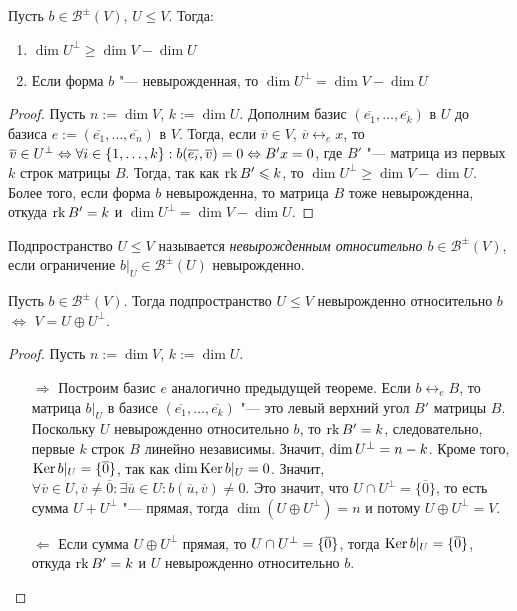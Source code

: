 \begin{theorem}Пусть $b \in \mathcal{B}^\pm(V)$, $U \le V$. Тогда:
	\begin{enumerate}
		\item $\dim{U^\perp} \ge \dim{V} - \dim{U}$
		\item Если форма $b$ "--- невырожденная, то $\dim{U^\perp} = \dim{V} - \dim{U}$
	\end{enumerate}
\end{theorem}

\begin{proof}
	Пусть $n := \dim{V}$, $k := \dim{U}$. Дополним базис $(\overline{e_1}, \dots, \overline{e_k})$ в $U$ до базиса $e := (\overline{e_1}, \dots, \overline{e_n})$ в $V$. Тогда, если $\overline{v} \in V$, $\overline{v} \leftrightarrow_e x$, то $\overline{v} \in U^\perp \hm\Leftrightarrow \forall i \in \{1, \dots, k\}: b(\overline{e_i}, \overline{v}) \hm{=} 0 \Leftrightarrow B'x = 0$, где $B'$ "--- матрица из первых $k$ строк матрицы $B$. Тогда, так как $\operatorname{rk}{B'} \leqslant k$, то $\dim{U^\perp} \ge \dim{V} - \dim{U}$. Более того, если форма $b$ невырожденна, то матрица $B$ тоже невырожденна, откуда $\operatorname{rk}{B'} = k$ и $\dim{U^\perp} = \dim{V} - \dim{U}$.
\end{proof}

\begin{definition}
	Подпространство $U \le V$ называется \textit{невырожденным относительно $b\in \mathcal{B}^{\pm}(V)$}, если ограничение $b|_U \in \mathcal{B}^{\pm}(U)$ невырожденно.
\end{definition}

\begin{theorem}
	Пусть $b \in \mathcal{B}^{\pm}(V)$. Тогда подпространство $U \le V$ невырожденно относительно $b$ $\Leftrightarrow$ $V = U \oplus U^{\perp}$.
\end{theorem}

\begin{proof} Пусть $n := \dim{V}$, $k := \dim{U}$.
	\begin{itemize}
		\item[$\Rightarrow$] Построим базис $e$ аналогично предыдущей теореме. Если $b \leftrightarrow_e B$, то матрица $b|_U$ в базисе $(\overline{e_1}, \dots, \overline{e_k})$ "--- это левый верхний угол $B'$ матрицы $B$. Поскольку $U$ невырожденно относительно $b$, то $\operatorname{rk}{B'} = k$, следовательно, первые $k$ строк $B$ линейно независимы. Значит, $\dim{U^{\perp}} \hm{=} n - k$. Кроме того, $\operatorname{Ker}{b|_U} = \{\overline{0}\}$, так как $\dim{\operatorname{Ker}{b|_U}} = 0$. Значит, $\forall \overline{v} \in U, \overline{v} \ne \overline{0}: \exists \overline{u} \in U: b(\overline{u}, \overline{v}) \ne 0$. Это значит, что $U \cap U^{\perp} = \{\overline{0}\}$, то есть сумма $U + U^{\perp}$ "--- прямая, тогда $\dim(U \oplus U^\perp) = n$ и потому $U \oplus U^{\perp} = V$.
		
		\item[$\Leftarrow$] Если сумма $U \oplus U^{\perp}$ прямая, то $U \cap U^{\perp} \hm{=} \{\overline{0}\}$, тогда $\ke{b|_U} \hm{=} \{\overline{0}\}$, откуда $\operatorname{rk}{B'} = k$ и $U$ невырожденно относительно $b$.\qedhere
	\end{itemize}
\end{proof}

